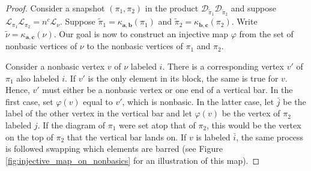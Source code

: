 \documentclass[10pt]{amsart}
\theoremstyle{definition}
\theoremstyle{definition}
\theoremstyle{plain}
\theoremstyle{remark}
\theoremstyle{plain}
\theoremstyle{plain}
\newcommand{\DD}{\mathcal{D}}
\newcommand{\LL}{\mathcal{L}}
\newcommand{\bfa}{{\boldsymbol{a}}}
\newcommand{\bfb}{{\boldsymbol{b}}}
\newcommand{\bfc}{{\boldsymbol{c}}}
\newcommand{\tpi}{{\tilde{\pi}}}
\newcommand{\tnu}{{\tilde{\nu}}}
\newcommand{\ov}[1]{\bar{#1}}
\begin{document}
\begin{proof}
    Consider a snapshot $(\pi_1,\pi_2)$ in the product $\DD_{\tpi_1}\DD_{\tpi_2}$ and suppose $\LL_{\pi_1}\LL_{\pi_2}=n^c\LL_\nu$. Suppose $\tpi_1=\kappa_{\bfa,\bfb}(\pi_1)$ and $\tpi_2=\kappa_{\bfb,\bfc}(\pi_2)$. Write $\tnu=\kappa_{\bfa,\bfc}(\nu)$. Our goal is now to construct an injective map $\varphi$ from the set of nonbasic vertices of $\nu$ to the nonbasic vertices of $\pi_1$ and $\pi_2$. 
    
    Consider a nonbasic vertex $v$ of $\nu$ labeled $i$. There is a corresponding vertex $v'$ of $\pi_1$ also labeled $i$. If $v'$ is the only element in its block, the same is true for $v$. Hence, $v'$ must either be a nonbasic vertex or one end of a vertical bar. In the first case, set $\varphi(v)$ equal to $v'$, which is nonbasic. In the latter case, let $\ov j$ be the label of the other vertex in the vertical bar and let $\varphi(v)$ be the vertex of $\pi_2$ labeled $j$. If the diagram of $\pi_1$ were set atop that of $\pi_2$, this would be the vertex on the top of $\pi_2$ that the vertical bar lands on. If $v$ is labeled $\ov i$, the same process is followed swapping which elements are barred (see Figure \ref{fig:injective_map_on_nonbasics} for an illustration of this map).


\end{proof}
\end{document}
